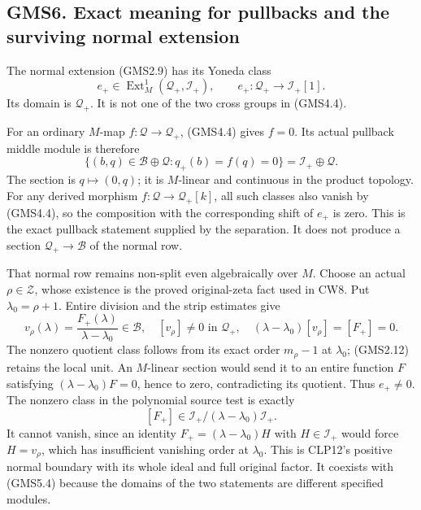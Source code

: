 \subsection{GMS6. Exact meaning for pullbacks and the surviving normal
extension}\label{gms6.-exact-meaning-for-pullbacks-and-the-surviving-normal-extension}

The normal extension (GMS2.9) has its Yoneda class \[
e_+\in\operatorname{Ext}^1_M(\mathcal Q_+,\mathcal I_+),
\qquad e_+:\mathcal Q_+\longrightarrow\mathcal I_+[1].
\tag{GMS6.1}
\] Its domain is \(\mathcal Q_+\). It is not one of the two cross groups
in (GMS4.4).

For an ordinary \(M\)-map \(f:\mathcal Q\to\mathcal Q_+\), (GMS4.4)
gives \(f=0\). Its actual pullback middle module is therefore \[
\{(b,q)\in\mathcal B\oplus\mathcal Q:q_+(b)=f(q)=0\}
=\mathcal I_+\oplus\mathcal Q.
\tag{GMS6.2}
\] The section is \(q\mapsto(0,q)\); it is \(M\)-linear and continuous
in the product topology. For any derived morphism
\(f:\mathcal Q\to\mathcal Q_+[k]\), all such classes also vanish by
(GMS4.4), so the composition with the corresponding shift of \(e_+\) is
zero. This is the exact pullback statement supplied by the separation.
It does not produce a section \(\mathcal Q_+\to\mathcal B\) of the
normal row.

That normal row remains non-split even algebraically over \(M\). Choose
an actual \(\rho\in\mathscr Z\), whose existence is the proved
original-zeta fact used in CW8. Put \(\lambda_0=\rho+1\). Entire
division and the strip estimates give \[
v_\rho(\lambda)=\frac{F_+(\lambda)}{\lambda-\lambda_0}\in\mathcal B,
\quad [v_\rho]\ne0\text{ in }\mathcal Q_+,\quad
(\lambda-\lambda_0)[v_\rho]=[F_+]=0.
\tag{GMS6.3}
\] The nonzero quotient class follows from its exact order \(m_\rho-1\)
at \(\lambda_0\); (GMS2.12) retains the local unit. An \(M\)-linear
section would send it to an entire function \(F\) satisfying
\((\lambda-\lambda_0)F=0\), hence to zero, contradicting its quotient.
Thus \(e_+\ne0\). The nonzero class in the polynomial source test is
exactly \[
[F_+]\in\mathcal I_+/(\lambda-\lambda_0)\mathcal I_+.
\tag{GMS6.4}
\] It cannot vanish, since an identity \(F_+=(\lambda-\lambda_0)H\) with
\(H\in\mathcal I_+\) would force \(H=v_\rho\), which has insufficient
vanishing order at \(\lambda_0\). This is CLP12's positive normal
boundary with its whole ideal and full original factor. It coexists with
(GMS5.4) because the domains of the two statements are different
specified modules.

